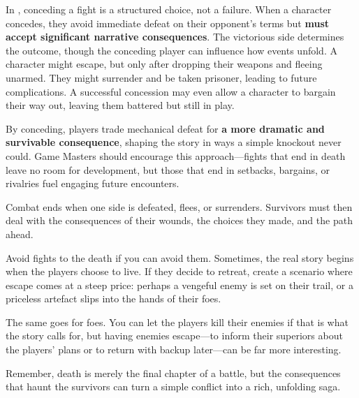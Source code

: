 In \wyrd, conceding a fight is a structured choice, not a failure. When a character concedes, they avoid immediate defeat on their opponent’s terms but \textbf{must accept significant narrative consequences}. The victorious side determines the outcome, though the conceding player can influence how events unfold. A character might escape, but only after dropping their weapons and fleeing unarmed. They might surrender and be taken prisoner, leading to future complications. A successful concession may even allow a character to bargain their way out, leaving them battered but still in play.

By conceding, players trade mechanical defeat for \textbf{a more dramatic and survivable consequence}, shaping the story in ways a simple knockout never could. Game Masters should encourage this approach—fights that end in death leave no room for development, but those that end in setbacks, bargains, or rivalries fuel engaging future encounters.

Combat ends when one side is defeated, flees, or surrenders. Survivors must then deal with the consequences of their wounds, the choices they made, and the path ahead.

\begin{WyrdGmTips}
	Avoid fights to the death if you can avoid them. Sometimes, the real story begins when the players choose to live. If they decide to retreat, create a scenario where escape comes at a steep price: perhaps a vengeful enemy is set on their trail, or a priceless artefact slips into the hands of their foes. 
	
	The same goes for foes. You can let the players kill their enemies if that is what the story calls for, but having enemies escape---to inform their superiors about the players' plans or to return with backup later---can be far more interesting.
	
	Remember, death is merely the final chapter of a battle, but the consequences that haunt the survivors can turn a simple conflict into a rich, unfolding saga.
\end{WyrdGmTips}

